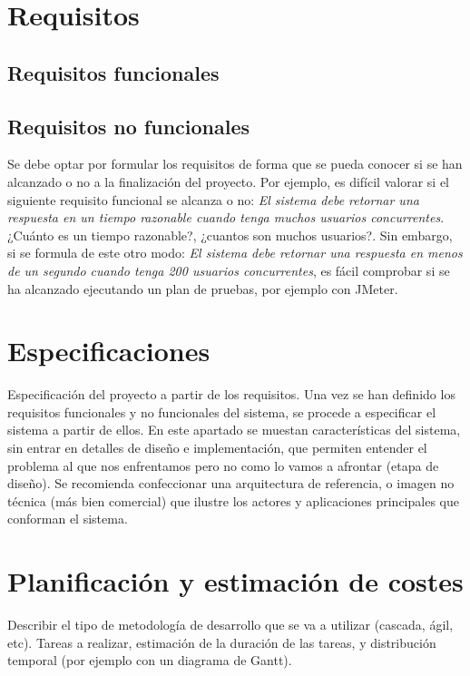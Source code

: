 
\section{Requisitos}

\subsection{Requisitos funcionales}

\subsection{Requisitos no funcionales}

Se debe optar por formular los requisitos de forma que se pueda
conocer si se han alcanzado o no a la finalización del proyecto. Por
ejemplo, es difícil valorar si el siguiente requisito funcional se
alcanza o no: \textit{El sistema debe retornar una respuesta en un tiempo
razonable cuando tenga muchos usuarios concurrentes}. ¿Cuánto es un
tiempo razonable?, ¿cuantos son muchos usuarios?. Sin embargo, si se
formula de este otro modo: \textit{El sistema debe retornar una
respuesta en menos de un segundo cuando tenga 200 usuarios
concurrentes}, es fácil comprobar si se ha alcanzado ejecutando un
plan de pruebas, por ejemplo con JMeter.

\section{Especificaciones}\label{sec:especificaciones-sistema}
Especificación del proyecto a partir de los requisitos.
Una vez se han definido los requisitos funcionales y no funcionales del sistema, se procede a especificar el sistema a partir de ellos. En este apartado se muestan características del sistema, sin entrar en detalles de diseño e implementación, que permiten entender el problema al que nos enfrentamos pero no como lo vamos a afrontar (etapa de diseño).
Se recomienda confeccionar una arquitectura de referencia, o imagen no técnica (más bien comercial) que ilustre los actores y aplicaciones principales que conforman el sistema.

\section{Planificación y estimación de costes}
Describir el tipo de metodología de desarrollo que se va a utilizar
(cascada, ágil, etc).
Tareas a realizar, estimación de la duración de las tareas, y
distribución temporal (por ejemplo con un diagrama de Gantt).

